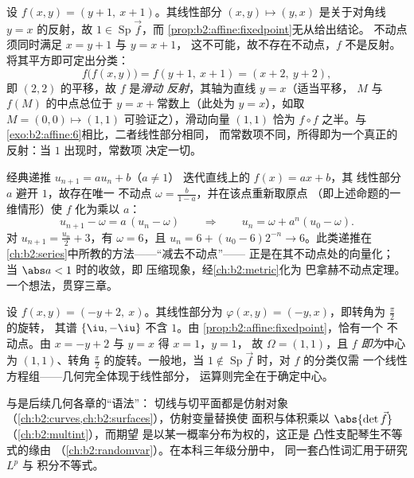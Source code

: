 \begin{example}\label{ex:b2:affine:glide}
设 $f(x, y) = (y + 1,\ x + 1)$。其线性部分 $(x, y)
\mapsto (y, x)$ 是关于对角线 $y = x$ 的反射，故
$1 \in \operatorname{Sp}\vec f$，而
\cref{prop:b2:affine:fixedpoint}无从给出结论。
不动点须同时满足 $x = y + 1$ 与 $y = x + 1$，
这不可能，故不存在不动点，$f$ 不是反射。
将其平方即可定出分类：
\[
f\bigl(f(x, y)\bigr) = f(y + 1,\ x + 1) = (x + 2,\ y + 2),
\]
即 $(2, 2)$ 的平移，故 $f$ 是\emph{滑动
反射}，其轴为直线 $y = x$（适当平移，
$M$ 与 $f(M)$ 的中点总位于
$y = x + {}$常数上（此处为 $y = x$），如取 $M = (0,
0) \mapsto (1,1)$ 可验证之），滑动向量 $(1, 1)$ 恰为 $f
\circ f$ 之半。与\cref{exo:b2:affine:6}相比，二者线性部分相同，
而常数项不同，所得即为一个真正的
反射：当 $1$ 出现时，常数项
决定一切。
\end{example}

\begin{example}\label{ex:b2:affine:recursion}
经典递推 $u_{n+1} = au_n + b$（$a \neq 1$）
迭代直线上的 $f(x) = ax + b$，其
线性部分 $a$ 避开 $1$，故存在唯一
不动点 $\omega = \frac{b}{1-a}$，并在该点重新取原点
（即上述命题的一维情形）使
$f$ 化为乘以 $a$：
\[
u_{n+1} - \omega = a\,(u_n - \omega)
\qquad\Longrightarrow\qquad
u_n = \omega + a^n(u_0 - \omega) .
\]
对 $u_{n+1} = \frac{u_n}2 + 3$，有 $\omega = 6$，且 $u_n = 6 +
(u_0 - 6)2^{-n} \to 6$。此类递推在
\cref{ch:b2:series}中所教的方法——“减去不动点”——
正是在其不动点处的向量化；
当 $\abs a < 1$ 时的收敛，即
压缩现象，经\cref{ch:b2:metric}化为
巴拿赫不动点定理。一个想法，贯穿三章。
\end{example}

\begin{example}[求旋转的中心]\label{ex:b2:affine:rotationcenter}
设 $f(x, y) = (-y + 2,\ x)$。其线性部分为
$\varphi(x, y) = (-y, x)$，即转角为 $\frac\pi2$ 的旋转，
其谱 $\{\iu, -\iu\}$ 不含 $1$。由
\cref{prop:b2:affine:fixedpoint}，恰有一个
不动点。由 $x = -y + 2$ 与 $y = x$ 得 $x = 1$，$y = 1$，
故 $\Omega = (1, 1)$，且 $f$ \emph{即为}中心为
$(1, 1)$、转角 $\frac\pi2$ 的旋转。一般地，当 $1
\notin \operatorname{Sp}\vec f$ 时，对 $f$ 的分类仅需
一个线性方程组——几何完全体现于线性部分，
运算则完全在于确定中心。
\end{example}

\begin{remark}[仿射语言的后续应用]
与是后续几何各章的“语法”：
切线与切平面都是仿射对象
（\cref{ch:b2:curves,ch:b2:surfaces}），仿射变量替换使
面积与体积乘以
$\abs{\det \vec f}$（\cref{ch:b2:multint}），而期望
是以某一概率分布为权的，这正是
凸性支配琴生不等式的缘由
（\cref{ch:b2:randomvar}）。在本科三年级分册中，
同一套凸性词汇用于研究 $L^p$ 与
积分不等式。
\end{remark}

